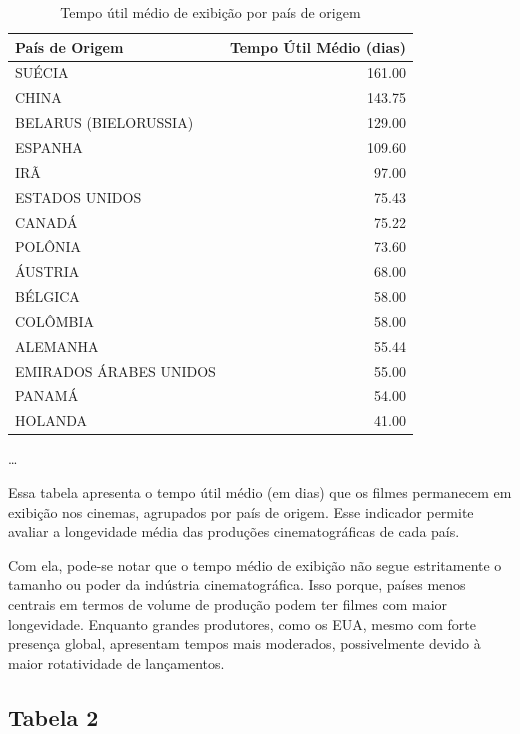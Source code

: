 \documentclass{article}
\begin{document}
\begin{table}[H]
\centering
\caption{Tempo útil médio de exibição por país de origem}
\begin{small}
\begin{tabular}{l r}
\hline
\textbf{País de Origem} & \textbf{Tempo Útil Médio (dias)} \\
\hline
SUÉCIA & 161.00 \\
CHINA & 143.75 \\
BELARUS (BIELORUSSIA) & 129.00 \\
ESPANHA & 109.60 \\
IRÃ & 97.00 \\
ESTADOS UNIDOS & 75.43 \\
CANADÁ & 75.22 \\
POLÔNIA & 73.60 \\
ÁUSTRIA & 68.00 \\
BÉLGICA & 58.00 \\
COLÔMBIA & 58.00 \\
ALEMANHA & 55.44 \\
EMIRADOS ÁRABES UNIDOS & 55.00 \\
PANAMÁ & 54.00 \\
HOLANDA & 41.00 \\
\end{tabular}
\end{small}

\begin{center}
\small
\ldots
\end{center}

\end{table}
 
 Essa tabela apresenta o tempo útil médio (em dias) que os filmes permanecem em exibição nos cinemas,
agrupados por país de origem. Esse indicador permite avaliar a longevidade média das produções cinematográficas de cada país.

Com ela, pode-se notar que o tempo médio de exibição não segue estritamente o tamanho ou poder da indústria cinematográfica.
Isso porque, países menos centrais em termos de volume de produção podem ter filmes com maior longevidade. Enquanto grandes produtores,
como os EUA, mesmo com forte presença global, apresentam tempos mais moderados, possivelmente devido à maior rotatividade de lançamentos.

\pagebreak
\subsection*{Tabela 2}
\end{document}
